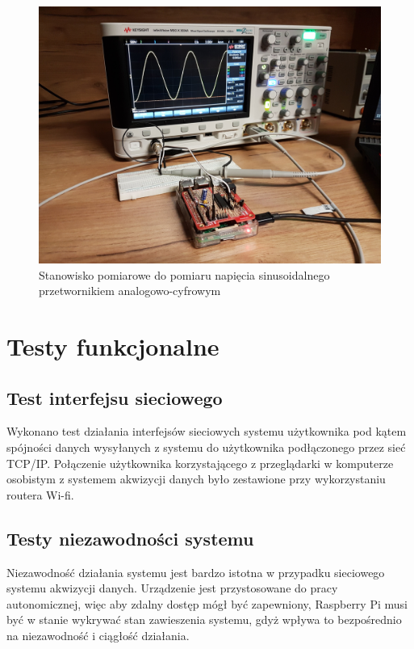 \begin{figure}[h]
	\centering
		\includegraphics[width=14cm]{stanowisko}
	\caption{Stanowisko pomiarowe do pomiaru napięcia sinusoidalnego przetwornikiem analogowo-cyfrowym} 
	\label{pic:RPi}
\end{figure}


\section{Testy funkcjonalne}


\subsection{Test interfejsu sieciowego}

Wykonano test działania interfejsów sieciowych systemu użytkownika pod kątem spójności danych wysyłanych z systemu do użytkownika podłączonego przez sieć TCP/IP. Połączenie użytkownika korzystającego z przeglądarki w komputerze osobistym z systemem akwizycji danych było zestawione przy wykorzystaniu routera Wi-fi.
 


\subsection{Testy niezawodności systemu}

Niezawodność działania systemu jest bardzo istotna w przypadku sieciowego systemu akwizycji danych. Urządzenie jest przystosowane do pracy autonomicznej, więc aby zdalny dostęp mógł być zapewniony, Raspberry Pi musi być w stanie wykrywać stan zawieszenia systemu, gdyż wpływa to bezpośrednio na niezawodność i ciągłość działania. 

